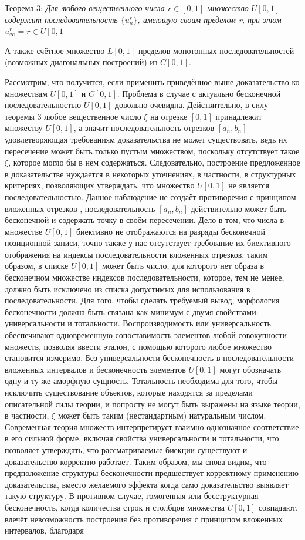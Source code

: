 \documentclass[12pt]{article}
\begin{document}
Теорема 3: {\sl Для любого вещественного числа $r \in [0, 1]$ множество $U[0, 1]$ содержит последовательность $\{u^r_n\}$, имеющую своим пределом r, при этом $u^r_{\infty} = r \in U[0, 1]$}

А также счётное множество $L[0, 1]$ пределов монотонных последовательностей (возможных диагональных построений) из $C[0, 1]$. 

Рассмотрим, что получится, если применить приведённое выше доказательство ко множествам $U[0, 1]$ и $C[0, 1]$. Проблема в случае с актуально бесконечной последовательностью $U[0, 1]$ довольно очевидна. Действительно, в силу теоремы 3 любое вещественное число $\xi$ на отрезке $[0, 1]$ принадлежит множеству $U[0, 1]$, а значит последовательность отрезков $[a_n, b_n]$ удовлетворяющая требованиям доказательства не может существовать, ведь их пересечение может быть только пустым множеством, поскольку отсутствует такое $\xi$, которое могло бы в нем содержаться. Следовательно, построение предложенное в доказательстве нуждается в некоторых уточнениях, в частности, в структурных критериях, позволяющих утверждать, что множество $U[0, 1]$ не является последовательностью. Данное наблюдение не создаёт противоречия с принципом вложенных отрезков \cite{matan-nested-interval}, последовательность $[a_n, b_n]$ действительно может быть бесконечной и содержать точку в своём пересечении. Дело в том, что числа в множестве $U[0, 1]$ биективно не отображаются на разряды бесконечной позиционной записи, точно также у нас отсутствует требование их биективного отображения на индексы последовательности вложенных отрезков, таким образом, в списке $U[0, 1]$ может быть число, для которого нет образа в бесконечном множестве индексов последовательности, которое, тем не менее, должно быть исключено из списка допустимых для использования в последовательности. Для того, чтобы сделать требуемый вывод, морфология бесконечности должна быть связана как минимум с двумя свойствами: универсальности и тотальности. Воспроизводимость или универсальность обеспечивают одновременную сопоставимость элементов любой совокупности множеств, позволяя ввести эталон, с помощью которого любое множество становится измеримо. Без универсальности бесконечность в последовательности вложенных интервалов и бесконечность элементов $U[0, 1]$ могут обозначать одну и ту же аморфную сущность. Тотальность необходима для того, чтобы исключить существование объектов, которые находятся за пределами описательной силы теории, и попросту не могут быть выражены на языке теории, в частности, $\xi$ может быть таким (нестандартным) натуральным числом. Современная теория множеств интерпретирует взаимно однозначное соответствие в его сильной форме, включая свойства универсальности и тотальности, что позволяет утверждать, что рассматриваемые биекции существуют и доказательство корректно работает. Таким образом, мы снова видим, что предположение структуры бесконечности предшествует корректному применению доказательства, вместо желаемого эффекта когда само доказательство выявляет такую структуру. В противном случае, гомогенная или бесструктурная бесконечность, когда количества строк и столбцов множества $U[0, 1]$ совпадают, влечёт невозможность построения без противоречия с принципом вложенных интервалов, благодаря 
\end{document}
